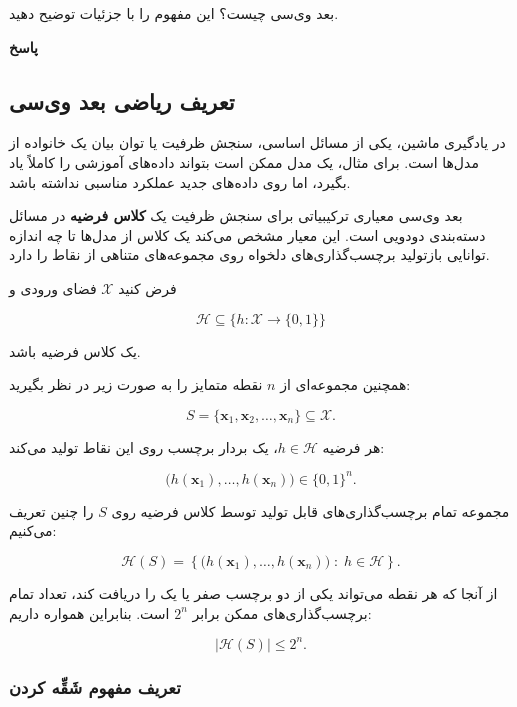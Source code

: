 \documentclass[12pt,a4paper]{article}
\newcommand{\en}[1]{\lr{#1}}
\newcommand{\answerheading}{%
    \par\vspace{0.10em}%
    {\color{accent}\bfseries پاسخ}\par\vspace{-0.2em}%
}
\begin{document}
\begin{promptbox}
بعد وی‌سی \en{(VC Dimension)} چیست؟
این مفهوم را با جزئیات توضیح دهید.
\end{promptbox}

\answerheading


\subsection{تعریف ریاضی بعد وی‌سی}

در یادگیری ماشین، یکی از مسائل اساسی،
سنجش ظرفیت یا توان بیان یک خانواده از مدل‌ها است.
برای مثال، یک مدل ممکن است بتواند داده‌های آموزشی
را کاملاً یاد بگیرد، اما روی داده‌های جدید عملکرد
مناسبی نداشته باشد.

بعد وی‌سی
معیاری ترکیبیاتی برای سنجش ظرفیت یک
\textbf{کلاس فرضیه}
در مسائل دسته‌بندی دودویی است.
این معیار مشخص می‌کند یک کلاس از مدل‌ها تا چه
اندازه توانایی بازتولید برچسب‌گذاری‌های دلخواه
روی مجموعه‌های متناهی از نقاط را دارد.

فرض کنید $\mathcal{X}$ فضای ورودی و

\[
\mathcal{H}
\subseteq
\{h:\mathcal{X}\rightarrow\{0,1\}\}
\]

یک کلاس فرضیه باشد.

همچنین مجموعه‌ای از $n$ نقطه متمایز را
به صورت زیر در نظر بگیرید:

\[
S=\{\mathbf{x}_1,\mathbf{x}_2,\ldots,\mathbf{x}_n\}
\subseteq\mathcal{X}.
\]

هر فرضیه $h\in\mathcal{H}$،
یک بردار برچسب روی این نقاط تولید می‌کند:

\[
\bigl(
h(\mathbf{x}_1),\ldots,h(\mathbf{x}_n)
\bigr)
\in\{0,1\}^{n}.
\]

مجموعه تمام برچسب‌گذاری‌های قابل تولید توسط
کلاس فرضیه روی $S$ را چنین تعریف می‌کنیم:

\[
\mathcal{H}(S)=
\left\{
\bigl(h(\mathbf{x}_1),\ldots,h(\mathbf{x}_n)\bigr)
\;:\;
h\in\mathcal{H}
\right\}.
\]

از آنجا که هر نقطه می‌تواند یکی از دو برچسب
صفر یا یک را دریافت کند، تعداد تمام
برچسب‌گذاری‌های ممکن برابر $2^n$ است.
بنابراین همواره داریم:

\[
|\mathcal{H}(S)|\leq 2^n.
\]

\subsubsection{تعریف مفهوم \textbf{شَقِّه کردن}}
\end{document}
